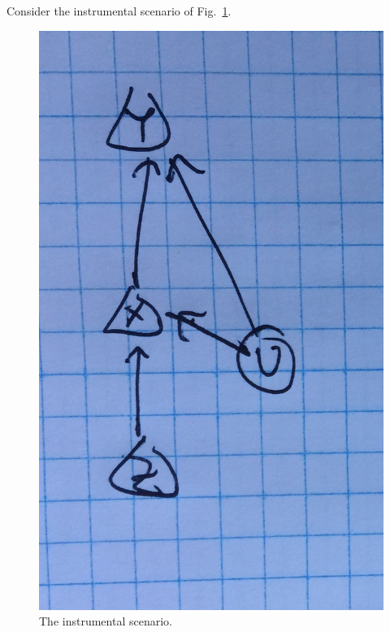 \documentclass[aps,english,superscriptaddress,onecolumn,twoside,longbibliography,pra,floatfix,fleqn,notitlepage,nofootinbib]{revtex4-1}
\theoremstyle{definition}
\begin{document}
Consider the instrumental scenario of Fig.~\ref{fig:instrumental}.  
\begin{figure}[htb]
\centering
\begin{minipage}[h!]{0.4\linewidth}
\centering
\includegraphics[scale=0.1]{Instrumental.jpg}
\caption{The instrumental scenario.}\label{fig:instrumental}
\end{minipage}
\hfill
\begin{minipage}[htb]{0.5\linewidth}
\centering

\end{minipage}
\end{figure}
\end{document}
